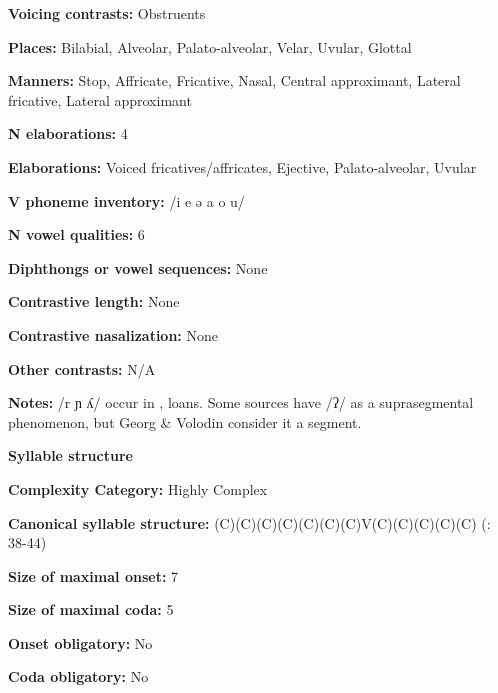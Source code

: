 \textbf{Voicing contrasts:} Obstruents



\textbf{Places:} Bilabial, Alveolar, Palato-alveolar, Velar, Uvular, Glottal



\textbf{Manners:} Stop, Affricate, Fricative, Nasal, Central approximant, Lateral fricative, Lateral approximant



\textbf{N elaborations:} 4



\textbf{Elaborations:} Voiced fricatives/affricates, Ejective, Palato-alveolar, Uvular



\textbf{V phoneme inventory:} /i e ə a o u/



\textbf{N vowel qualities:} 6



\textbf{Diphthongs or vowel sequences:} None



\textbf{Contrastive length:} None



\textbf{Contrastive nasalization:} None



\textbf{Other contrasts:} N/A



\textbf{Notes:} /r ɲ ʎ/ occur in ,  loans. Some sources have /ʔ/ as a suprasegmental phenomenon, but Georg \& Volodin consider it a segment. 



\textbf{Syllable structure}



\textbf{Complexity Category:} Highly Complex



\textbf{Canonical syllable structure:} (C)(C)(C)(C)(C)(C)(C)V(C)(C)(C)(C)(C) (\citealt{GeorgVolodin1999}: 38-44)



\textbf{Size of maximal onset:} 7



\textbf{Size of maximal coda:} 5



\textbf{Onset obligatory:} No



\textbf{Coda obligatory:} No



